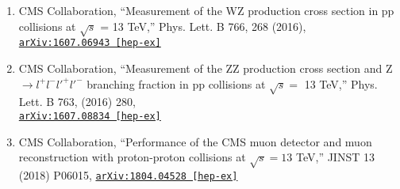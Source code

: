 \documentclass[10pt]{res} %
\begin{document}
\begin{resume}
\begin{enumerate}
  \item CMS Collaboration, ``Measurement of the WZ production cross section in pp collisions at $\sqrt{s}$ = 13 TeV,''
Phys. Lett. B 766, 268 (2016), \href{https://arxiv.org/abs/1607.06943}{\texttt{arXiv:1607.06943 [hep-ex]}}
  \item CMS Collaboration, ``Measurement of the ZZ production cross section and Z $\rightarrow l^{+}l^{-}l'^{+}l'^{-}$ branching fraction in pp collisions at $\sqrt{s} =$ 13 TeV,''
Phys. Lett. B 763, (2016) 280, \\ \href{https://arxiv.org/abs/1607.08834} {\texttt{arXiv:1607.08834 [hep-ex]}}
  \item CMS Collaboration, ``Performance of the CMS muon detector and muon reconstruction with proton-proton collisions at $\sqrt{s} = 13$ TeV,''
JINST 13 (2018) P06015, \href{https://arxiv.org/abs/1804.04528} {\texttt{arXiv:1804.04528 [hep-ex]}}
\end{enumerate}


\end{resume}
\end{document}

